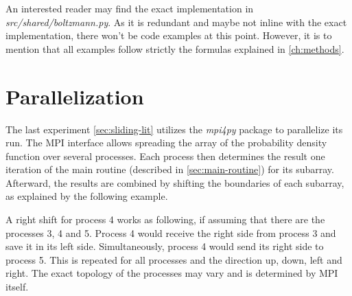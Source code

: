 An interested reader may find the exact implementation in \textit{src/shared/boltzmann.py}.
As it is redundant and maybe not inline with the exact implementation, there won't be code examples at this point.
However, it is to mention that all examples follow strictly the formulas explained in \cref{ch:methods}.


\section{Parallelization}\label{sec:parallelization}
The last experiment \cref{sec:sliding-lit} utilizes the \textit{mpi4py} package to parallelize its run.
The MPI interface allows spreading the array of the probability density function over several processes.
Each process then determines the result one iteration of the main routine (described in \cref{sec:main-routine}) for its subarray.
Afterward, the results are combined by shifting the boundaries of each subarray, as explained by the following example.
\newline

A right shift for process 4 works as following, if assuming that there are the processes 3, 4 and 5.
Process 4 would receive the right side from process 3 and save it in its left side.
Simultaneously, process 4 would send its right side to process 5.
This is repeated for all processes and the direction up, down, left and right.
The exact topology of the processes may vary and is determined by MPI itself.
